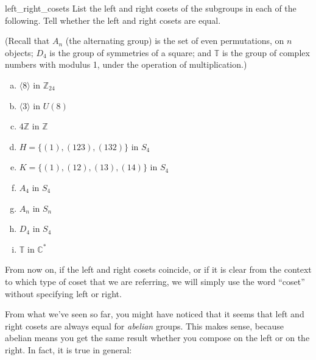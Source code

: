 \begin{exercise}{left_right_cosets}
List the left and right cosets of the subgroups in each of the following.  Tell whether the left and right cosets are equal.

\noindent
(Recall that $A_n$ (the alternating group) is the set of even permutations, on $n$ objects; $D_4$ is the group of symmetries of a square; and ${\mathbb T}$ is the group of complex numbers with modulus 1, under the operation of multiplication.)

\begin{multicols}{2}
\begin{enumerate}[(a)]

\item 
$\langle 8 \rangle$ in ${\mathbb Z}_{24}$

\item
$\langle 3 \rangle$ in $U(8)$

\item
$4{\mathbb Z}$ in ${\mathbb Z}$

\item
$H = \{ (1), (123), (132) \}$ in $S_4$

\item
$K =\{ (1), (12), (13), (14) \}$ in $S_4$

\item
$A_4$ in $S_4$

\item
$A_n$ in $S_n$

\item
$D_4$ in $S_4$

\item
${\mathbb T}$ in ${\mathbb C}^\ast$ 






\end{enumerate}
\end{multicols}
\end{exercise} 

\begin{rem}
From now on, if the left and right cosets coincide, or if it is clear from the context to which type of coset that we are referring, we will simply use the word ``coset'' without specifying left or right.
\end{rem}

From what we've seen so far, you might have noticed that it seems that left and right cosets are always equal for \emph{abelian} groups.  This makes sense, because
 abelian means you get the same result whether you compose on the left or on the right. In fact, it is true in general: 

